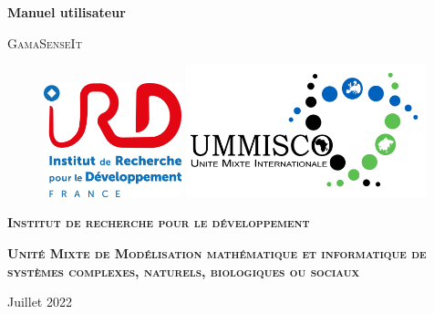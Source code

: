 
\begin{titlepage}
    \centering


    \vspace{10cm}
    {\huge\bfseries Manuel utilisateur\par}
    \vspace{1cm}
    {\scshape\LARGE GamaSenseIt \par}

    \vspace{2cm}

    \begin{figure}[H]
        \begin{center}
            \href{https://www.ird.fr}{\includegraphics[width=4cm]{resources/ird}}
            \hspace{0.5cm}
            \href{https://www.ummisco.fr}{\includegraphics[width=7cm]{resources/ummisco}}
        \end{center}\label{fig:garde}
    \end{figure}

    \vspace{2cm}

    {\scshape\Large\bfseries Institut de recherche pour le développement\par}
    \vspace{1cm}
    {\scshape\bfseries Unité Mixte de Modélisation mathématique et informatique de systèmes complexes, naturels, biologiques ou sociaux\par}

    \vfill

    \large Juillet 2022

\end{titlepage}
